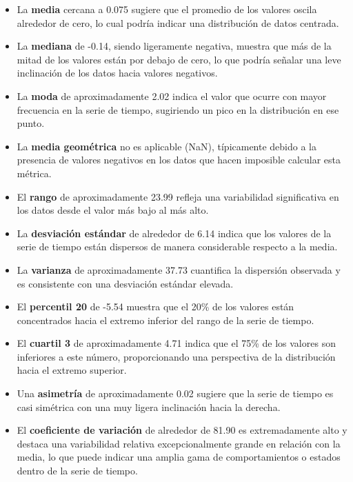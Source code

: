 \documentclass[11pt]{article} %
\begin{document}
	\begin{itemize}
		\item La \textbf{media} cercana a 0.075 sugiere que el promedio de los valores oscila alrededor de cero, lo cual podría indicar una distribución de datos centrada.
		
		\item La \textbf{mediana} de -0.14, siendo ligeramente negativa, muestra que más de la mitad de los valores están por debajo de cero, lo que podría señalar una leve inclinación de los datos hacia valores negativos.
		
		\item La \textbf{moda} de aproximadamente 2.02 indica el valor que ocurre con mayor frecuencia en la serie de tiempo, sugiriendo un pico en la distribución en ese punto.
		
		\item La \textbf{media geométrica} no es aplicable (NaN), típicamente debido a la presencia de valores negativos en los datos que hacen imposible calcular esta métrica.
		
		\item El \textbf{rango} de aproximadamente 23.99 refleja una variabilidad significativa en los datos desde el valor más bajo al más alto.
		
		\item La \textbf{desviación estándar} de alrededor de 6.14 indica que los valores de la serie de tiempo están dispersos de manera considerable respecto a la media.
		
		\item La \textbf{varianza} de aproximadamente 37.73 cuantifica la dispersión observada y es consistente con una desviación estándar elevada.
		
		\item El \textbf{percentil 20} de -5.54 muestra que el 20\% de los valores están concentrados hacia el extremo inferior del rango de la serie de tiempo.
		
		\item El \textbf{cuartil 3} de aproximadamente 4.71 indica que el 75\% de los valores son inferiores a este número, proporcionando una perspectiva de la distribución hacia el extremo superior.
		
		\item Una \textbf{asimetría} de aproximadamente 0.02 sugiere que la serie de tiempo es casi simétrica con una muy ligera inclinación hacia la derecha.
		
		\item El \textbf{coeficiente de variación} de alrededor de 81.90 es extremadamente alto y destaca una variabilidad relativa excepcionalmente grande en relación con la media, lo que puede indicar una amplia gama de comportamientos o estados dentro de la serie de tiempo.
		

\end{itemize}
\end{document}
